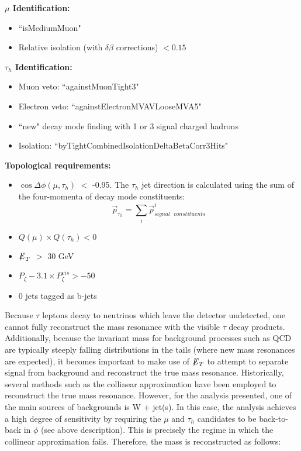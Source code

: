 \textbf{$\mu$ Identification:}

\begin{itemize}
  \item ``isMediumMuon"
  \item Relative isolation (with $\delta\beta$ corrections) $< 0.15$
\end{itemize}

\textbf{$\tau_{h}$ Identification:}

\begin{itemize}
  \item Muon veto: ``againstMuonTight3"
  \item Electron veto: ``againstElectronMVAVLooseMVA5"
  \item ``new" decay mode finding with 1 or 3 signal charged hadrons
  \item Isolation: ``byTightCombinedIsolationDeltaBetaCorr3Hits"
\end{itemize}

\textbf{Topological requirements:}

\begin{itemize}
  \item $\cos \Delta \phi (\mu,\tau_{h})$ $<$ -0.95. The $\tau_{h}$ jet direction is calculated using the sum of the four-momenta of decay mode constituents:
\begin{equation}
   \overrightarrow{p}_{\tau_{h}} = \sum_{i} \overrightarrow{p}_{signal\mbox{ }constituents}^{i}
   \label{eq:taudirection}
\end{equation}
  \item $Q(\mu) \times Q(\tau_{h}) < 0 $
  \item ${\not\mathrel{E}}_T$ $>$ 30 GeV
  \item $P_{\zeta}- 3.1 \times P_{\zeta}^{vis} > -50$
  \item 0 jets tagged as b-jets
\end{itemize}

Because $\tau$ leptons decay to neutrinos which leave the detector undetected, one cannot fully reconstruct the mass resonance with the visible $\tau$ decay 
products. Additionally, because the invariant mass for background processes such as QCD are typically steeply falling distributions in the tails (where new mass 
resonances are expected), it becomes important to make use of ${\not\mathrel{E}}_T$ to attempt to separate signal from background and reconstruct the true mass 
resonance. Historically, several methods such as the collinear approximation have been employed to reconstruct the true mass resonance. However, for the analysis 
presented, one of the main sources of backgrounds is W + jet(s). In this case, the analysis achieves a high degree of sensitivity by requiring the 
$\mu$ and $\tau_{h}$ candidates to be back-to-back in $\phi$ (see above description). This is precisely the regime in 
which the collinear approximation fails. Therefore, the mass is reconstructed as follows:

